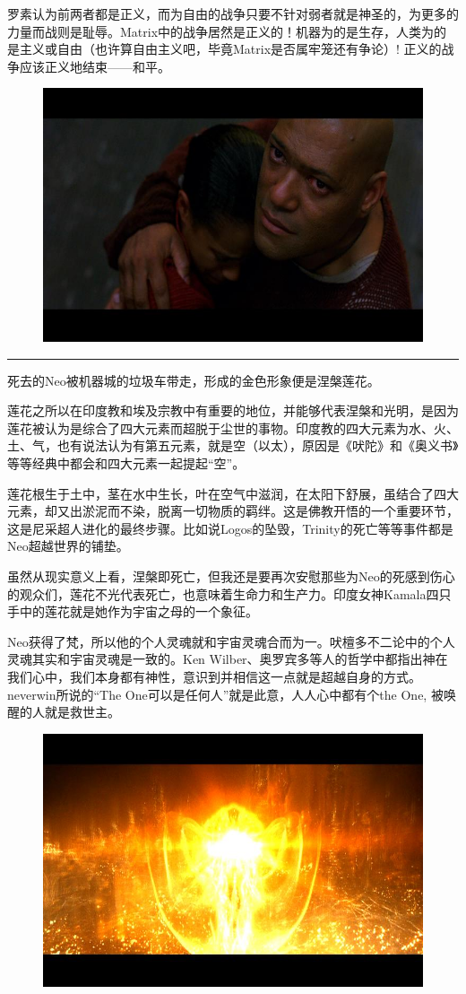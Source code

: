 \documentclass[UTF8]{ctexart}
\newcommand{\myparsep}{\noindent \rule[0.5ex]{\linewidth}{1pt}}
\begin{document}
罗素认为前两者都是正义，而为自由的战争只要不针对弱者就是神圣的，为更多的力量而战则是耻辱。Matrix中的战争居然是正义的！机器为的是生存，人类为的是主义或自由（也许算自由主义吧，毕竟Matrix是否属牢笼还有争论）! 正义的战争应该正义地结束——和平。

\begin{figure}[htb]
\centering
\includegraphics[width=0.5\linewidth]{fig/948b380177e8230a7aec2c5a.jpg}
\end{figure}

\myparsep

死去的Neo被机器城的垃圾车带走，形成的金色形象便是涅槃莲花。

莲花之所以在印度教和埃及宗教中有重要的地位，并能够代表涅槃和光明，是因为莲花被认为是综合了四大元素而超脱于尘世的事物。印度教的四大元素为水、火、土、气，也有说法认为有第五元素，就是空（以太），原因是《吠陀》和《奥义书》等等经典中都会和四大元素一起提起“空”。

莲花根生于土中，茎在水中生长，叶在空气中滋润，在太阳下舒展，虽结合了四大元素，却又出淤泥而不染，脱离一切物质的羁绊。这是佛教开悟的一个重要环节，这是尼采超人进化的最终步骤。比如说Logos的坠毁，Trinity的死亡等等事件都是Neo超越世界的铺垫。

虽然从现实意义上看，涅槃即死亡，但我还是要再次安慰那些为Neo的死感到伤心的观众们，莲花不光代表死亡，也意味着生命力和生产力。印度女神Kamala四只手中的莲花就是她作为宇宙之母的一个象征。

Neo获得了梵，所以他的个人灵魂就和宇宙灵魂合而为一。吠檀多不二论中的个人灵魂其实和宇宙灵魂是一致的。Ken Wilber、奥罗宾多等人的哲学中都指出神在我们心中，我们本身都有神性，意识到并相信这一点就是超越自身的方式。neverwin所说的“The One可以是任何人”就是此意，人人心中都有个the One, 被唤醒的人就是救世主。

\begin{figure}[htb]
\centering
\includegraphics[width=0.5\linewidth]{fig/3c153812375c4954f819b8d4.jpg}
\end{figure}
\end{document}
